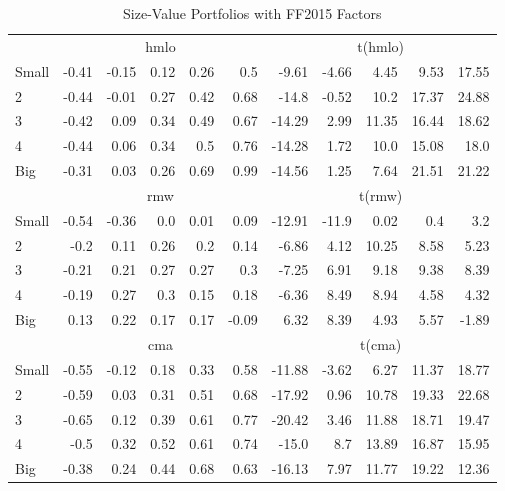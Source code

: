\begin{table}[!ht]
\begin{tabular}{lrrrrrrrrrr}
  

      & \multicolumn{5}{c}{hmlo} & \multicolumn{5}{c}{t(hmlo)} \\
    \cmidrule(r){2-6} \cmidrule(r){7-11}
      Small  & -0.41  & -0.15  & 0.12  & 0.26  & 0.5   & -9.61  & -4.66  & 4.45  & 9.53  & 17.55  \\
          2  & -0.44  & -0.01  & 0.27  & 0.42  & 0.68   & -14.8  & -0.52  & 10.2  & 17.37  & 24.88  \\
          3  & -0.42  & 0.09  & 0.34  & 0.49  & 0.67   & -14.29  & 2.99  & 11.35  & 16.44  & 18.62  \\
          4  & -0.44  & 0.06  & 0.34  & 0.5  & 0.76   & -14.28  & 1.72  & 10.0  & 15.08  & 18.0  \\
      Big    & -0.31  & 0.03  & 0.26  & 0.69  & 0.99   & -14.56  & 1.25  & 7.64  & 21.51  & 21.22  \\

  

      & \multicolumn{5}{c}{rmw} & \multicolumn{5}{c}{t(rmw)} \\
    \cmidrule(r){2-6} \cmidrule(r){7-11}
      Small  & -0.54  & -0.36  & 0.0  & 0.01  & 0.09   & -12.91  & -11.9  & 0.02  & 0.4  & 3.2  \\
          2  & -0.2  & 0.11  & 0.26  & 0.2  & 0.14   & -6.86  & 4.12  & 10.25  & 8.58  & 5.23  \\
          3  & -0.21  & 0.21  & 0.27  & 0.27  & 0.3   & -7.25  & 6.91  & 9.18  & 9.38  & 8.39  \\
          4  & -0.19  & 0.27  & 0.3  & 0.15  & 0.18   & -6.36  & 8.49  & 8.94  & 4.58  & 4.32  \\
      Big    & 0.13  & 0.22  & 0.17  & 0.17  & -0.09   & 6.32  & 8.39  & 4.93  & 5.57  & -1.89  \\

  

      & \multicolumn{5}{c}{cma} & \multicolumn{5}{c}{t(cma)} \\
    \cmidrule(r){2-6} \cmidrule(r){7-11}
      Small  & -0.55  & -0.12  & 0.18  & 0.33  & 0.58   & -11.88  & -3.62  & 6.27  & 11.37  & 18.77  \\
          2  & -0.59  & 0.03  & 0.31  & 0.51  & 0.68   & -17.92  & 0.96  & 10.78  & 19.33  & 22.68  \\
          3  & -0.65  & 0.12  & 0.39  & 0.61  & 0.77   & -20.42  & 3.46  & 11.88  & 18.71  & 19.47  \\
          4  & -0.5  & 0.32  & 0.52  & 0.61  & 0.74   & -15.0  & 8.7  & 13.89  & 16.87  & 15.95  \\
      Big    & -0.38  & 0.24  & 0.44  & 0.68  & 0.63   & -16.13  & 7.97  & 11.77  & 19.22  & 12.36  \\

  

  \bottomrule
\end{tabular}
\caption{Size-Value Portfolios with FF2015 Factors} 
\label{25_Size_Value_FF2015}
\end{table}